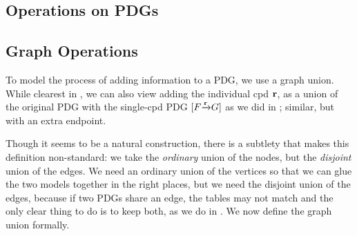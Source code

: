 \begin{vfull}
\section{Operations on PDGs}\label{sec:pdg-operations}
\subsection{Graph Operations}
To model the process of adding information to a PDG, we use a graph union. While clearest in , we can also view adding the individual cpd $\mathbf{r}$, as a union of the original PDG with the single-cpd PDG $[F \smash{\xrightarrow{\mathbf{r}}} G]$ as we did in ;  similar, but with an extra endpoint.

Though it seems to be a natural construction, there is a subtlety that makes this definition non-standard: we take the \emph{ordinary} union of the nodes, but the \emph{disjoint} union of the edges. We need an ordinary union of the vertices so that we can glue the two models together in the right places, but we need the disjoint union of the edges, because if two PDGs share an edge, the tables may not match and the only clear thing to do is to keep both, as we do in . 
We now define the graph union formally. 


\end{vfull}
